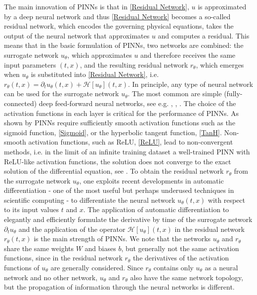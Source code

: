 The main innovation of PINNs is that in \cref{Residual Network}, $u$ is approximated by a deep neural network and thus \cref{Residual Network} becomes a so-called residual network, which encodes the governing physical equations, takes the output of the neural network that approximates $u$ and computes a residual. This means that in the basic formulation of PINNs, two networks are combined: the surrogate network $u_\theta$, which approximates $u$ and therefore receives the same input parameters $(t,x)$, and the resulting residual network $r_\theta$, which emerges when $u_\theta$ is substituted into \cref{Residual Network}, i.e. $r_\theta(t,x) = \partial_t u_\theta (t,x) + \mathcal{H} \left[ u_\theta \right] (t, x)$. In principle, any type of neural network can be used for the surrogate network $u_\theta$. The most common are simple (fully-connected) deep feed-forward neural networks, see e.g. \cite{RaissiPerdikarisKarniadakis:2019}, \cite{BlechschmidtErnst:2021}, \cite{Markidis:2021}. The choice of the activation functions in each layer is critical for the performance of PINNs. As shown by \cite{MishraMolinaro:2021} PINNs require sufficiently smooth activation functions such as the sigmoid function, \cref{Sigmoid}, or the hyperbolic tangent function, \cref{TanH}. Non-smooth activation functions, such as ReLU, \cref{ReLU}, lead to non-convergent methods, i.e. in the limit of an infinite training dataset a well-trained PINN with ReLU-like activation functions, the solution does not converge to the exact solution of the differential equation, see \cite{MishraMolinaro:2021}. To obtain the residual network $r_\theta$ from the surrogate network $u_\theta$, one exploits recent developments in automatic differentiation - one of the most useful but perhaps underused techniques in scientific computing - to differentiate the neural network $u_\theta(t,x)$ with respect to its input values $t$ and $x$. The application of automatic differentiation to elegantly and efficiently formulate the derivative by time of the surrogate network $\partial_t u_\theta$ and the application of the operator $\mathcal{H} \left[ u_\theta \right] (t,x)$ in the residual network $r_\theta(t,x)$ is the main strength of PINNs. We note that the networks $u_\theta$ and $r_\theta$ share the same weights $W$ and biases $b$, but generally not the same activation functions, since in the residual network $r_\theta$ the derivatives of the activation functions of $u_\theta$ are generally considered. Since $r_\theta$ contains only $u_\theta$ as a neural network and no other network, $u_\theta$ and $r_\theta$ also have the same network topology, but the propagation of information through the neural networks is different. \\

